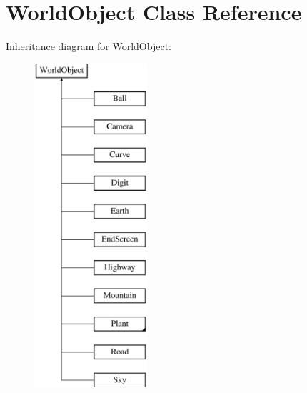 \hypertarget{class_world_object}{\section{World\+Object Class Reference}
\label{class_world_object}
}
Inheritance diagram for World\+Object\+:\begin{figure}[H]
\begin{center}
\leavevmode
\includegraphics[height=12.000000cm]{class_world_object}
\end{center}
\end{figure}
